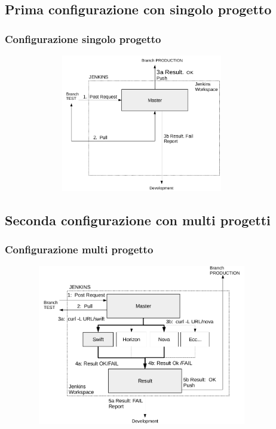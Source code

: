 \documentclass{beamer}
\theoremstyle{definition}
\theoremstyle{plain}
\begin{document}
\subsection{Prima configurazione con singolo progetto}
\begin{frame}
\frametitle{Configurazione singolo progetto}
\begin{figure}[!h]
	\begin{center}
\includegraphics[width=10cm, height=6cm]{conf1.png}
\end{center}
\end{figure}
\end{frame}

\subsection{Seconda configurazione con multi progetti}
\begin{frame}
\frametitle{Configurazione multi progetto}
\begin{figure}[!h]
	\begin{center}
\includegraphics[width=10cm, height=7cm]{conf2.png}
\end{center}
\end{figure}
\end{frame}
\end{document}
